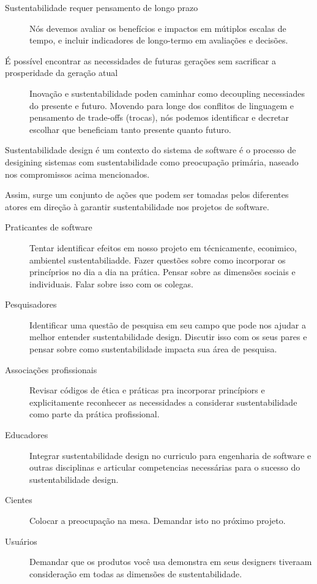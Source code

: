 \begin{description}
  \item [Sustentabilidade requer pensamento de longo prazo]
    Nós devemos avaliar os benefícios e impactos em mútiplos escalas de tempo, e incluir
    indicadores de longo-termo em avaliações e decisões.

  \item [É possível encontrar as necessidades de futuras gerações sem sacrificar a prosperidade da geração atual]
    Inovação e sustentabilidade poden caminhar como decoupling necessiades do presente e futuro.
    Movendo para longe dos conflitos de linguagem e pensamento de trade-offs (trocas), nós podemos
    identificar e decretar escolhar que beneficiam tanto presente quanto futuro.

\end{description}

Sustentabilidade design é um contexto do sistema de software é o processo de
desigining sistemas com sustentabilidade como preocupação primária, naseado nos
compromissos acima mencionados.

Assim, surge um conjunto de ações que podem ser tomadas pelos diferentes atores
em direção à garantir sustentabilidade nos projetos de software.

\begin{description}
  \item [Praticantes de software]
    Tentar identificar efeitos em nosso projeto em técnicamente, econimico, ambientel sustentabiliadde.
    Fazer questões sobre como incorporar os princíprios no dia a dia na prática. Pensar sobre
    as dimensões sociais e individuais. Falar sobre isso com os colegas.

  \item [Pesquisadores]
    Identificar uma questão de pesquisa em seu campo que pode nos ajudar a melhor
    entender sustentabilidade design. Discutir isso com os seus pares e pensar sobre como sustentabilidade
    impacta sua área de pesquisa.

  \item [Associações profissionais]
    Revisar códigos de ética e práticas pra incorporar princípiors e explicitamente reconhecer
    as necessidades a considerar sustentabilidade como parte da prática profissional.

  \item [Educadores]
    Integrar sustentabilidade design no curriculo para engenharia de software e outras
    disciplinas e articular competencias necessárias para o sucesso do sustentabilidade design.

  \item [Cientes]
    Colocar a preocupação na mesa. Demandar isto no próximo projeto.

  \item [Usuários]
    Demandar que os produtos você usa demonstra em seus designers tiveraam consideração
    em todas as dimensões de sustentabilidade.

\end{description}

